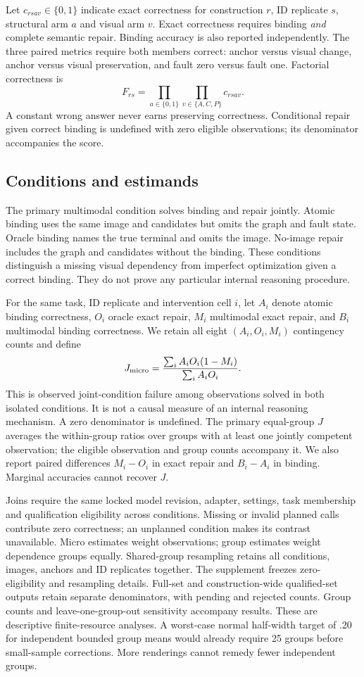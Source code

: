 \documentclass[10pt,twocolumn,letterpaper]{article}
\begin{document}
Let $c_{rsav}\in\{0,1\}$ indicate exact correctness for construction
$r$, ID replicate $s$, structural arm $a$ and visual arm $v$.
Exact correctness requires binding \emph{and} complete semantic
repair. Binding accuracy is also reported independently.
The three paired metrics require both members correct: anchor versus
visual change, anchor versus visual preservation, and fault zero
versus fault one. Factorial correctness is
\[
F_{rs}=\prod_{a\in\{0,1\}}\prod_{v\in\{A,C,P\}}c_{rsav}.
\]
A constant wrong answer never earns preserving correctness.
Conditional repair given correct binding is undefined with zero
eligible observations; its denominator accompanies the score.

\subsection{Conditions and estimands}
The primary multimodal condition solves binding and repair jointly.
Atomic binding uses the same image and candidates but omits the
graph and fault state. Oracle binding names the true terminal and
omits the image. No-image repair includes the graph and candidates
without the binding. These conditions distinguish a missing visual
dependency from imperfect optimization given a correct binding.
They do not prove any particular internal reasoning procedure.

For the same task, ID replicate and intervention cell $i$, let
$A_i$ denote atomic binding correctness, $O_i$ oracle exact repair,
$M_i$ multimodal exact repair, and $B_i$ multimodal binding correctness.
We retain all eight $(A_i,O_i,M_i)$ contingency counts and define
\[
J_{\rm micro}=
\frac{\sum_i A_iO_i(1-M_i)}{\sum_i A_iO_i}.
\]
This is observed joint-condition failure among observations solved
in both isolated conditions. It is not a causal measure of an
internal reasoning mechanism. A zero denominator is undefined.
The primary equal-group $J$ averages the within-group ratios over
groups with at least one jointly competent observation; the
eligible observation and group counts accompany it.
We also report paired differences $M_i-O_i$ in exact repair and
$B_i-A_i$ in binding. Marginal accuracies cannot recover $J$.

Joins require the same locked model revision, adapter, settings,
task membership and qualification eligibility across conditions.
Missing or invalid planned calls contribute zero correctness;
an unplanned condition makes its contrast unavailable.
Micro estimates weight observations; group estimates weight
dependence groups equally. Shared-group resampling retains all
conditions, images, anchors and ID replicates together.
The supplement freezes zero-eligibility and resampling details.
Full-set and construction-wide qualified-set outputs retain
separate denominators, with pending and rejected counts.
Group counts and leave-one-group-out sensitivity accompany results.
These are descriptive finite-resource analyses. A worst-case normal
half-width target of .20 for independent bounded group means would
already require 25 groups before small-sample corrections. More
renderings cannot remedy fewer independent groups.
\end{document}
